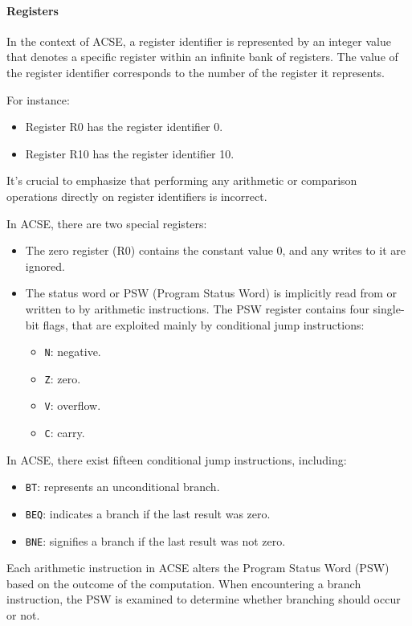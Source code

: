 \paragraph*{Registers}
In the context of ACSE, a register identifier is represented by an integer value that denotes a specific register within an infinite bank of registers. 
The value of the register identifier corresponds to the number of the register it represents. 
\begin{example}
    For instance:
    \begin{itemize}
        \item Register R0 has the register identifier 0.
        \item Register R10 has the register identifier 10.
    \end{itemize}
\end{example}
It's crucial to emphasize that performing any arithmetic or comparison operations directly on register identifiers is incorrect.

In ACSE, there are two special registers:
\begin{itemize}
    \item The zero register (R0) contains the constant value 0, and any writes to it are ignored.
    \item The status word or PSW (Program Status Word) is implicitly read from or written to by arithmetic instructions.
        The PSW register contains four single-bit flags, that are exploited mainly by conditional jump instructions:
        \begin{itemize}
            \item \texttt{N}: negative. 
            \item \texttt{Z}: zero. 
            \item \texttt{V}: overflow. 
            \item \texttt{C}: carry. 
        \end{itemize}
\end{itemize}

In ACSE, there exist fifteen conditional jump instructions, including:
\begin{itemize}
    \item \texttt{BT}: represents an unconditional branch.
    \item \texttt{BEQ}: indicates a branch if the last result was zero.
    \item \texttt{BNE}: signifies a branch if the last result was not zero.
\end{itemize}
Each arithmetic instruction in ACSE alters the Program Status Word (PSW) based on the outcome of the computation.
When encountering a branch instruction, the PSW is examined to determine whether branching should occur or not.